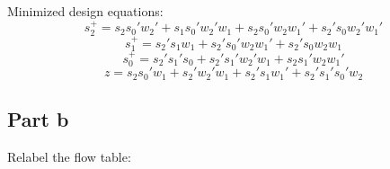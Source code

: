 \documentclass[12pt, a4paper]{article}
\begin{document}
	Minimized design equations:
	$$s_2^+ = s_2s_0'w_2' + s_1s_0'w_2'w_1 + s_2s_0'w_2w_1' + s_2's_0w_2'w_1'$$
	$$s_1^+ = s_2's_1w_1 + s_2's_0'w_2w_1' + s_2's_0w_2w_1$$
	$$s_0^+ = s_2's_1's_0 + s_2's_1'w_2'w_1 + s_2s_1'w_2w_1'$$
	$$z = s_2s_0'w_1 + s_2'w_2'w_1 + s_2's_1w_1' + s_2's_1's_0'w_2$$
	
	\subsection*{Part b}
	Relabel the flow table:
	\begin{center}
	\end{center}
	
\end{document}
